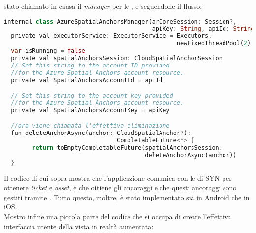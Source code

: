 \e{} stato chiamato in causa il \textit{manager} per le \asa{}, e seguendone il flusso:

\begin{lstlisting}[language=dart, label={lst:asa_manager_delete}, firstnumber=1,caption={Eliminazione \textit{cloud anchor} lato Android, chiamata}]
internal class AzureSpatialAnchorsManager(arCoreSession: Session?, 
                                          apiKey: String, apiId: String) {
  private val executorService: ExecutorService = Executors.
                                                 newFixedThreadPool(2)
  var isRunning = false
  private val spatialAnchorsSession: CloudSpatialAnchorSession
  // Set this string to the account ID provided 
  //for the Azure Spatial Anchors account resource.
  private val SpatialAnchorsAccountId = apiId

  // Set this string to the account key provided 
  //for the Azure Spatial Anchors account resource.
  private val SpatialAnchorsAccountKey = apiKey

  //ora viene chiamata l'effettiva eliminazione
  fun deleteAnchorAsync(anchor: CloudSpatialAnchor?): 
                                CompletableFuture<*> {
        return toEmptyCompletableFuture(spatialAnchorsSession.
                                        deleteAnchorAsync(anchor))
  }
\end{lstlisting}

Il codice di cui sopra mostra che l'applicazione comunica con le \api{} di SYN per ottenere \textit{ticket} e \textit{asset}, e che ottiene gli ancoraggi e che questi ancoraggi sono gestiti tramite \asa{}. Tutto questo, inoltre, è stato implementato sia in Android che in iOS.\\
Mostro infine una piccola parte del codice che si occupa di creare l'effettiva interfaccia utente della vista in realtà aumentata:

